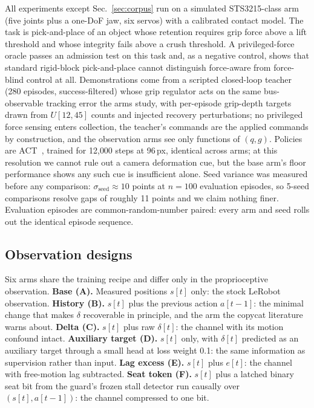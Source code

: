 \documentclass{article}
\begin{document}
All experiments except Sec.~\ref{sec:corpus} run on a simulated
STS3215-class arm (five joints plus a one-DoF jaw, six servos) with a
calibrated contact model. The task is pick-and-place of an object whose
retention requires grip force above a lift threshold and whose integrity
fails above a crush threshold. A privileged-force oracle passes an
admission test on this task and, as a negative control, shows that
standard rigid-block pick-and-place cannot distinguish force-aware from
force-blind control at all. Demonstrations come from a scripted
closed-loop teacher (280 episodes, success-filtered) whose grip regulator
acts on the same bus-observable tracking error the arms study, with
per-episode grip-depth targets drawn from $U[12, 45]$ counts and injected
recovery perturbations; no privileged force sensing enters collection, the
teacher's commands are the applied commands by construction, and the
observation arms see only functions of $(q, g)$. Policies are
ACT~\citep{zhao2023act}, trained for 12{,}000 steps at 96\,px, identical
across arms; at
this resolution we cannot rule out a camera deformation cue, but the base
arm's floor performance shows any such cue is insufficient alone. Seed
variance was measured before any comparison:
$\sigma_{\text{seed}} \approx 10$ points at $n = 100$ evaluation
episodes, so 5-seed comparisons resolve gaps of roughly 11 points and we
claim nothing finer. Evaluation episodes are common-random-number paired:
every arm and seed rolls out the identical episode sequence.

\subsection{Observation designs}
\label{sec:arms}

Six arms share the training recipe and differ only in the proprioceptive
observation. \textbf{Base (A).} Measured positions $s[t]$ only: the stock
LeRobot observation. \textbf{History (B).} $s[t]$ plus the previous
action $a[t{-}1]$: the minimal change that makes $\delta$ recoverable in
principle, and the arm the copycat literature~\citep{dehaan2019causal,
wen2020copycat} warns about. \textbf{Delta (C).} $s[t]$ plus raw
$\delta[t]$: the channel with its motion confound intact.
\textbf{Auxiliary target (D).} $s[t]$ only, with $\delta[t]$ predicted as
an auxiliary target through a small head at loss weight 0.1: the same
information as supervision rather than input. \textbf{Lag excess (E).}
$s[t]$ plus $e[t]$: the channel with free-motion lag subtracted.
\textbf{Seat token (F).} $s[t]$ plus a latched binary seat bit from the
guard's frozen stall detector run causally over $(s[t], a[t{-}1])$: the
channel compressed to one bit.
\end{document}
